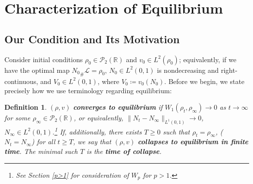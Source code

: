 \documentclass[10pt,a4paper]{amsart}
\newtheorem{lemma}[thm]{Lemma}
\newtheorem{defn}[thm]{Definition}
\numberwithin{equation}{section}
\begin{document}
\section{Characterization of Equilibrium}
    \subsection{Our Condition and Its Motivation}



    
    Consider initial conditions $\rho_0\in\mathcal{P}_2(\mathbb{R})$ and $v_0\in L^2(\rho_0)$; equivalently, if we have the optimal map ${N_0}_\#\mathcal{L}=\rho_0$, $N_0\in L^2(0,1)$ is nondecreasing and right-continuous, and $V_0\in L^2(0,1)$, where $V_0\coloneq v_0(N_0)$. Before we begin, we state precisely how we use terminology regarding equilibrium: 
    \begin{defn}\label{equilibrium-def}
        $(\rho,v)$ \textbf{converges to equilibrium} if \mbox{$W_1(\rho_t, \rho_\infty)\to0$} as $t\to\infty$ for some \mbox{$\rho_\infty\in \mathcal{P}_2(\mathbb{R})$}, or equivalently, \mbox{$\|N_t-N_\infty\|_{L^1(0,1)}\to0$}, $N_\infty\in L^2(0,1)$.\footnote{See Section \ref{p>1} for consideration of $W_p$ for $p>1$.} If, additionally, there exists $T\geq0$ such that $\rho_t=\rho_\infty$, ($N_t=N_\infty$) for all $t\geq T$, we say that $(\rho,v)$ \textbf{collapses to equilibrium in finite time}. The minimal such $T$ is the \textbf{time of collapse}.
\end{defn}
    
\end{document}
